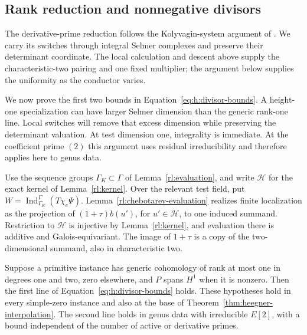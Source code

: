 \subsection{Rank reduction and nonnegative divisors}\label{sec:h:rank-reduction}

The derivative-prime reduction follows the Kolyvagin-system argument of
\citet[Lemmas~1.5.3 and~1.6.4]{Howard2012}. We carry its switches
through integral Selmer complexes and preserve their determinant
coordinate. The local calculation and descent above supply the
characteristic-two pairing and one fixed multiplier; the argument
below supplies the uniformity as the conductor varies.

We now prove the first two bounds in Equation~\eqref{eq:h:divisor-bounds}.
A height-one specialization can have larger Selmer dimension than the
generic rank-one line. Local switches will remove that excess dimension
while preserving the determinant valuation. At test dimension one,
integrality is immediate. At the coefficient prime $(2)$ this argument
uses residual irreducibility and therefore applies here to genus data.

Use the sequence groups $\Gamma_K\subset\Gamma$ of
Lemma~\ref{rl:evaluation}, and write $\mathcal H$ for the exact
kernel of Lemma~\ref{rl:kernel}. Over the relevant test field, put
$W=\operatorname{Ind}_{\Gamma_K}^{\Gamma}(T\chi_e\Psi)$.
Lemma~\ref{rl:chebotarev-evaluation} realizes finite localization as
the projection of $(1+\tau)b(u')$, for $u'\in\mathcal H$, to one
induced summand. Restriction to $\mathcal H$ is injective by
Lemma~\ref{rl:kernel}, and evaluation there is additive and
Galois-equivariant. The image of $1+\tau$ is a copy of the
two-dimensional summand, also in characteristic two.

\begin{lemma}
\label{lem:h:height-one-reduction}
Suppose a primitive instance has generic cohomology of rank at most one
in degrees one and two, zero elsewhere, and $P$ spans $H^1$ when it is
nonzero. Then the first line of Equation~\eqref{eq:h:divisor-bounds}
holds. These hypotheses hold in every simple-zero instance and also at
the base of Theorem~\ref{thm:heegner-interpolation}. The second line holds in
genus data with irreducible $E[2]$, with a bound independent of the
number of active or derivative primes.
\end{lemma}

